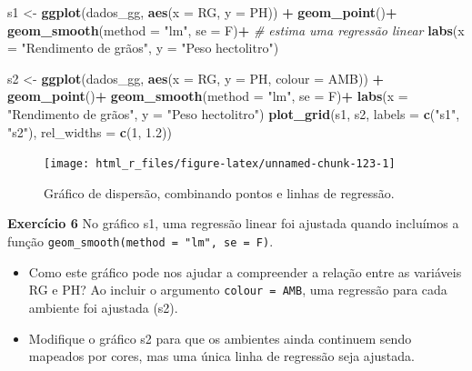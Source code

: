 \documentclass[
]{book}
\newenvironment{Shaded}{\begin{snugshade}}{\end{snugshade}}
\newcommand{\CommentTok}[1]{\textcolor[rgb]{0.56,0.35,0.01}{\textit{#1}}}
\newcommand{\DataTypeTok}[1]{\textcolor[rgb]{0.13,0.29,0.53}{#1}}
\newcommand{\DecValTok}[1]{\textcolor[rgb]{0.00,0.00,0.81}{#1}}
\newcommand{\FloatTok}[1]{\textcolor[rgb]{0.00,0.00,0.81}{#1}}
\newcommand{\KeywordTok}[1]{\textcolor[rgb]{0.13,0.29,0.53}{\textbf{#1}}}
\newcommand{\NormalTok}[1]{#1}
\newcommand{\OperatorTok}[1]{\textcolor[rgb]{0.81,0.36,0.00}{\textbf{#1}}}
\newcommand{\StringTok}[1]{\textcolor[rgb]{0.31,0.60,0.02}{#1}}
\begin{document}
\begin{Shaded}
\begin{Highlighting}[]

\NormalTok{s1 <-}\StringTok{ }\KeywordTok{ggplot}\NormalTok{(dados_gg, }\KeywordTok{aes}\NormalTok{(}\DataTypeTok{x =}\NormalTok{ RG, }\DataTypeTok{y =}\NormalTok{ PH)) }\OperatorTok{+}
\StringTok{      }\KeywordTok{geom_point}\NormalTok{()}\OperatorTok{+}
\StringTok{      }\KeywordTok{geom_smooth}\NormalTok{(}\DataTypeTok{method =} \StringTok{"lm"}\NormalTok{, }\DataTypeTok{se =}\NormalTok{ F)}\OperatorTok{+}\StringTok{ }\CommentTok{# estima uma regressão linear}
\StringTok{      }\KeywordTok{labs}\NormalTok{(}\DataTypeTok{x =} \StringTok{"Rendimento de grãos"}\NormalTok{, }\DataTypeTok{y =} \StringTok{"Peso hectolitro"}\NormalTok{)}

\NormalTok{s2 <-}\StringTok{ }\KeywordTok{ggplot}\NormalTok{(dados_gg, }\KeywordTok{aes}\NormalTok{(}\DataTypeTok{x =}\NormalTok{ RG, }\DataTypeTok{y =}\NormalTok{ PH, }\DataTypeTok{colour =}\NormalTok{ AMB)) }\OperatorTok{+}
\StringTok{      }\KeywordTok{geom_point}\NormalTok{()}\OperatorTok{+}
\StringTok{      }\KeywordTok{geom_smooth}\NormalTok{(}\DataTypeTok{method =} \StringTok{"lm"}\NormalTok{, }\DataTypeTok{se =}\NormalTok{ F)}\OperatorTok{+}
\StringTok{      }\KeywordTok{labs}\NormalTok{(}\DataTypeTok{x =} \StringTok{"Rendimento de grãos"}\NormalTok{, }\DataTypeTok{y =} \StringTok{"Peso hectolitro"}\NormalTok{)}
\KeywordTok{plot_grid}\NormalTok{(s1, s2, }\DataTypeTok{labels =} \KeywordTok{c}\NormalTok{(}\StringTok{"s1"}\NormalTok{, }\StringTok{"s2"}\NormalTok{), }\DataTypeTok{rel_widths  =} \KeywordTok{c}\NormalTok{(}\DecValTok{1}\NormalTok{, }\FloatTok{1.2}\NormalTok{))}
\end{Highlighting}
\end{Shaded}

\begin{figure}

{\centering \texttt{[image: html\_r\_files/figure-latex/unnamed-chunk-123-1]} 

}

\caption{Gráfico de dispersão, combinando pontos e linhas de regressão.}\label{fig:unnamed-chunk-123}
\end{figure}

\begin{tarefa}
\textbf{Exercício 6}
No gráfico s1, uma regressão linear foi ajustada quando incluímos a função \texttt{geom\_smooth(method\ =\ "lm",\ se\ =\ F)}.

\begin{itemize}
\item
  Como este gráfico pode nos ajudar a compreender a relação entre as variáveis RG e PH? Ao incluir o argumento \texttt{colour\ =\ AMB}, uma regressão para cada ambiente foi ajustada (s2).
\item
  Modifique o gráfico s2 para que os ambientes ainda continuem sendo mapeados por cores, mas uma única linha de regressão seja ajustada.
\end{itemize}
\end{tarefa}
\end{document}
